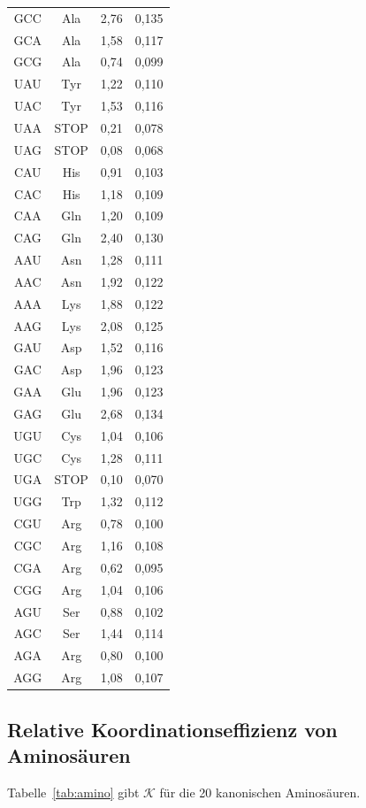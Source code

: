 \documentclass[12pt,a4paper]{article}
\newcommand{\REL}{\mathcal{K}}          %
\begin{document}
\begin{longtable}{|c|c|c|c|}
		GCC & Ala & 2,76 & 0,135 \\
		GCA & Ala & 1,58 & 0,117 \\
		GCG & Ala & 0,74 & 0,099 \\
		UAU & Tyr & 1,22 & 0,110 \\
		UAC & Tyr & 1,53 & 0,116 \\
		UAA & STOP & 0,21 & 0,078 \\
		UAG & STOP & 0,08 & 0,068 \\
		CAU & His & 0,91 & 0,103 \\
		CAC & His & 1,18 & 0,109 \\
		CAA & Gln & 1,20 & 0,109 \\
		CAG & Gln & 2,40 & 0,130 \\
		AAU & Asn & 1,28 & 0,111 \\
		AAC & Asn & 1,92 & 0,122 \\
		AAA & Lys & 1,88 & 0,122 \\
		AAG & Lys & 2,08 & 0,125 \\
		GAU & Asp & 1,52 & 0,116 \\
		GAC & Asp & 1,96 & 0,123 \\
		GAA & Glu & 1,96 & 0,123 \\
		GAG & Glu & 2,68 & 0,134 \\
		UGU & Cys & 1,04 & 0,106 \\
		UGC & Cys & 1,28 & 0,111 \\
		UGA & STOP & 0,10 & 0,070 \\
		UGG & Trp & 1,32 & 0,112 \\
		CGU & Arg & 0,78 & 0,100 \\
		CGC & Arg & 1,16 & 0,108 \\
		CGA & Arg & 0,62 & 0,095 \\
		CGG & Arg & 1,04 & 0,106 \\
		AGU & Ser & 0,88 & 0,102 \\
		AGC & Ser & 1,44 & 0,114 \\
		AGA & Arg & 0,80 & 0,100 \\
		AGG & Arg & 1,08 & 0,107 \\
		\hline
	\end{longtable}
	
	\subsection{Relative Koordinationseffizienz von Aminosäuren}
	\label{sec:aminoacids}
	Tabelle~\ref{tab:amino} gibt \(\REL\) für die 20 kanonischen Aminosäuren.
	
\end{document}
